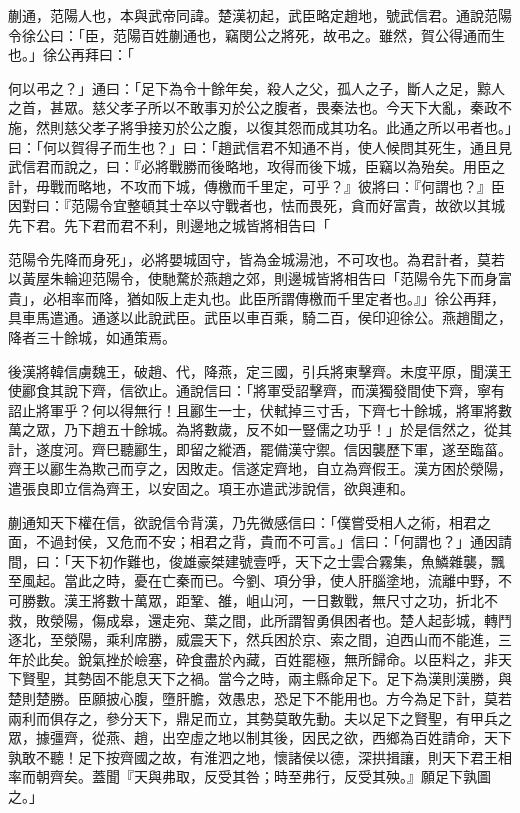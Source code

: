 
\begin{pinyinscope}
蒯通，范陽人也，本與武帝同諱。楚漢初起，武臣略定趙地，號武信君。通說范陽令徐公曰：「臣，范陽百姓蒯通也，竊閔公之將死，故弔之。雖然，賀公得通而生也。」徐公再拜曰：「

何以弔之？」通曰：「足下為令十餘年矣，殺人之父，孤人之子，斷人之足，黥人之首，甚眾。慈父孝子所以不敢事刃於公之腹者，畏秦法也。今天下大亂，秦政不施，然則慈父孝子將爭接刃於公之腹，以復其怨而成其功名。此通之所以弔者也。」曰：「何以賀得子而生也？」曰：「趙武信君不知通不肖，使人候問其死生，通且見武信君而說之，曰：『必將戰勝而後略地，攻得而後下城，臣竊以為殆矣。用臣之計，毋戰而略地，不攻而下城，傳檄而千里定，可乎？』彼將曰：『何謂也？』臣因對曰：『范陽令宜整頓其士卒以守戰者也，怯而畏死，貪而好富貴，故欲以其城先下君。先下君而君不利，則邊地之城皆將相告曰「

范陽令先降而身死」，必將嬰城固守，皆為金城湯池，不可攻也。為君計者，莫若以黃屋朱輪迎范陽令，使馳騖於燕趙之郊，則邊城皆將相告曰「范陽令先下而身富貴」，必相率而降，猶如阪上走丸也。此臣所謂傳檄而千里定者也。』」徐公再拜，具車馬遣通。通遂以此說武臣。武臣以車百乘，騎二百，侯印迎徐公。燕趙聞之，降者三十餘城，如通策焉。

後漢將韓信虜魏王，破趙、代，降燕，定三國，引兵將東擊齊。未度平原，聞漢王使酈食其說下齊，信欲止。通說信曰：「將軍受詔擊齊，而漢獨發間使下齊，寧有詔止將軍乎？何以得無行！且酈生一士，伏軾掉三寸舌，下齊七十餘城，將軍將數萬之眾，乃下趙五十餘城。為將數歲，反不如一豎儒之功乎！」於是信然之，從其計，遂度河。齊巳聽酈生，即留之縱酒，罷備漢守禦。信因襲歷下軍，遂至臨菑。齊王以酈生為欺己而亨之，因敗走。信遂定齊地，自立為齊假王。漢方困於滎陽，遣張良即立信為齊王，以安固之。項王亦遣武涉說信，欲與連和。

蒯通知天下權在信，欲說信令背漢，乃先微感信曰：「僕嘗受相人之術，相君之面，不過封侯，又危而不安；相君之背，貴而不可言。」信曰：「何謂也？」通因請間，曰：「天下初作難也，俊雄豪桀建號壹呼，天下之士雲合霧集，魚鱗雜襲，飄至風起。當此之時，憂在亡秦而已。今劉、項分爭，使人肝腦塗地，流離中野，不可勝數。漢王將數十萬眾，距鞏、雒，岨山河，一日數戰，無尺寸之功，折北不救，敗滎陽，傷成皋，還走宛、葉之間，此所謂智勇俱困者也。楚人起彭城，轉鬥逐北，至滎陽，乘利席勝，威震天下，然兵困於京、索之間，迫西山而不能進，三年於此矣。銳氣挫於嶮塞，砕食盡於內藏，百姓罷極，無所歸命。以臣料之，非天下賢聖，其勢固不能息天下之禍。當今之時，兩主縣命足下。足下為漢則漢勝，與楚則楚勝。臣願披心腹，墮肝膽，效愚忠，恐足下不能用也。方今為足下計，莫若兩利而俱存之，參分天下，鼎足而立，其勢莫敢先動。夫以足下之賢聖，有甲兵之眾，據彊齊，從燕、趙，出空虛之地以制其後，因民之欲，西鄉為百姓請命，天下孰敢不聽！足下按齊國之故，有淮泗之地，懷諸侯以德，深拱揖讓，則天下君王相率而朝齊矣。蓋聞『天與弗取，反受其咎；時至弗行，反受其殃。』願足下孰圖之。」


\end{pinyinscope}
